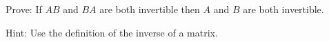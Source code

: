 
\begin{Exercise}[
name={},
title={}, 
difficulty=0,
origin={\cite{YL}}]
Prove: If $AB$ and $BA$ are both invertible then $A$ and $B$ are both invertible.
\end{Exercise}

\begin{Answer}
Hint: Use the definition of the inverse of a matrix.
\end{Answer}
